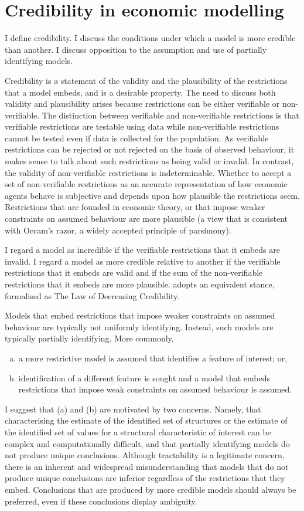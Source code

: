 \documentclass[12pt,a4paper,twoside]{article}
\numberwithin{equation}{section}
\begin{document}
\section{Credibility in economic modelling}
I define credibility. I discuss the conditions under which a model is more credible than another. I discuss opposition to the assumption and use of partially identifying models.

Credibility is a statement of the validity and the plausibility of the restrictions that a model embeds, and is a desirable property. The need to discuss both validity and plausibility arises because restrictions can be either verifiable or non-verifiable. The distinction between verifiable and non-verifiable restrictions is that verifiable restrictions are testable using data while non-verifiable restrictions cannot be tested even if data is collected for the population. As verifiable restrictions can be rejected or not rejected on the basis of observed behaviour, it makes sense to talk about such restrictions as being valid or invalid. In contrast, the validity of non-verifiable restrictions is indeterminable. Whether to accept a set of non-verifiable restrictions as an accurate representation of how economic agents behave is subjective and depends upon how plausible the restrictions seem. Restrictions that are founded in economic theory, or that impose weaker constraints on assumed behaviour are more plausible (a view that is consistent with Occam's razor, a widely accepted principle of parsimony).      

I regard a model as incredible if the verifiable restrictions that it embeds are invalid. I regard a model as more credible relative to another if the verifiable restrictions that it embeds are valid and if the sum of the non-verifiable restrictions that it embeds are more plausible. \cite{book.manski} adopts an equivalent stance, formalised as The Law of Decreasing Credibility. 

Models that embed restrictions that impose weaker constraints on assumed behaviour are typically not uniformly identifying. Instead, such models are typically partially identifying. More commonly, 
\begin{enumerate}[(a)]
\item a more restrictive model is assumed that identifies a feature of interest; or,
\item identification of a different feature is sought and a model that embeds restrictions that impose weak constraints on assumed behaviour is assumed.
\end{enumerate}
I suggest that (a) and (b) are motivated by two concerns. Namely, that characterising the estimate of the identified set of structures or the estimate of the identified set of values for a structural characteristic of interest can be complex and computationally difficult, and that partially identifying models do not produce unique conclusions. Although tractability is a legitimate concern, there is an inherent and widespread misunderstanding that models that do not produce unique conclusions are inferior regardless of the restrictions that they embed. Conclusions that are produced by more credible models should always be preferred, even if these conclusions display ambiguity. 
\end{document}
